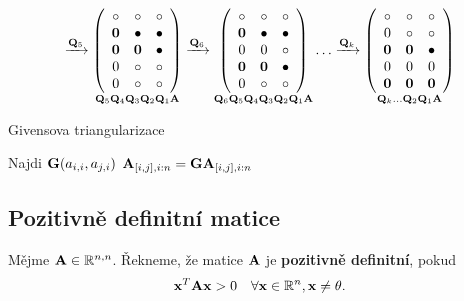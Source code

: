\begin{gather*}
	\xrightarrow{\mQ_5}
	\underset{\mQ_5 \mQ_4 \mQ_3 \mQ_2 \mQ_1 \mA}{ \left({\begin{array}{*{20}c} \circ    & \circ    & \circ    \\ \mathbf{0}  & \bullet  & \bullet  \\ \mathbf{0}  & \mathbf{0}  & \bullet  \\ 0       & \circ    & \circ    \\ 0       & \circ    & \circ    \\ \end{array}} \right) }
	\xrightarrow{\mQ_6}
	\underset{\mQ_6 \mQ_5 \mQ_4 \mQ_3 \mQ_2 \mQ_1 \mA}{ \left({\begin{array}{*{20}c} \circ    & \circ    & \circ    \\ \mathbf{0}  & \bullet  & \bullet  \\ 0       & 0        & \circ    \\ \mathbf{0}  & \mathbf{0}  & \bullet  \\ 0       & \circ    & \circ    \\ \end{array}} \right) }
	\ldots
	\xrightarrow{\mQ_k}
	\underset{\mQ_k \dots \mQ_2 \mQ_1 \mA}{ \left({\begin{array}{*{20}c} \circ    & \circ    & \circ    \\ 0       & \circ    & \circ    \\ \mathbf{0}  & \mathbf{0}  & \bullet  \\ 0       & 0        & 0        \\ \mathbf{0}  & \mathbf{0}  & \mathbf{0}  \\ \end{array}} \right) }
\end{gather*}

\begin{algorithm*}
	\caption{Givensova triangularizace}
	\begin{algorithmic}
		\STATE Najdi $\mathbf{G}(a_{i,i},a_{j,i})$
		\STATE $\mathbf{A}_{[i,j],i:n} = \mathbf{G} \mathbf{A}_{[i,j],i:n}$
		\ENDFOR
		\ENDFOR
	\end{algorithmic}
\end{algorithm*}

\subsection*{Pozitivně definitní matice}

Mějme $\mathbf{A} \in \mathbb{R}^{n,n}$. Řekneme, že matice $\mathbf{A}$ je \textbf{pozitivně
	definitní}, pokud
\[ \mathbf{x}^T \mathbf{A} \mathbf{x} > 0 \quad \forall \mathbf{x} \in \mathbb{R}^{n}, \mathbf{x} \neq \theta. \]

